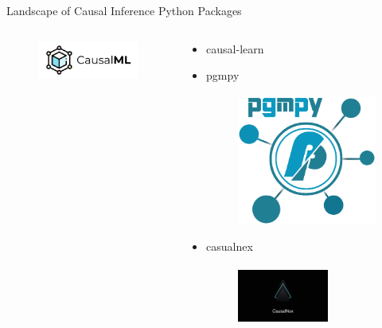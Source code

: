 \documentclass[aspectratio=169]{beamer}
\begin{document}
\begin{frame}{Landscape of Causal Inference Python Packages}
\begin{columns}
\begin{column}[T]{0.55 \textwidth}
\begin{itemize}
					\begin{figure}
						\includegraphics[scale=0.3]{imgs/causalml.png}
					\end{figure}
			\end{itemize}

		\end{column}
		\vrule
		\begin{column}[T]{0.45 \textwidth}
			\begin{itemize}
				\item causal-learn
				\item pgmpy
					\begin{figure}
						\includegraphics[scale=0.2]{imgs/pgmpy.png}
					\end{figure}
				\item casualnex
					\begin{figure}
						\includegraphics[height=2cm, width=3cm, scale=0.2]{imgs/causalnex.png}
					\end{figure}
			\end{itemize}
		\end{column}
	\end{columns}
\end{frame}
\end{document}
